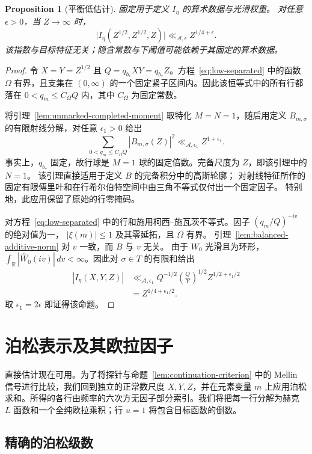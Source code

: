 \documentclass[11pt,a4paper]{article}
\numberwithin{equation}{section}
\numberwithin{figure}{section}
\newtheorem{proposition}[theorem]{Proposition}
\theoremstyle{definition}
\theoremstyle{remark}
\begin{document}
\begin{proposition}[平衡低估计]
\label{prop:balanced-low}
固定用于定义 $I_\eta$ 的算术数据与光滑权重。
对任意 $\epsilon>0$，当 $Z\to\infty$ 时，
\[
 \bigl|I_\eta(Z^{1/2},Z^{1/2},Z)\bigr|
 \ll_{\mathcal A,\epsilon} Z^{1/4+\epsilon}.
\]
该指数与目标特征无关；隐含常数与下阈值可能依赖于其固定的算术数据。
\end{proposition}

\begin{proof}
令 $X=Y=Z^{1/2}$ 且 $Q=q_{b_*}XY=q_{b_*}Z$。方程~\eqref{eq:low-separated} 中的函数 $\Omega$
有界，且支集在 $(0,\infty)$ 的一个固定紧子区间内。因此该恒等式中的所有行都落在
$0<q_m\le C_\Omega Q$ 内，其中 $C_\Omega$ 为固定常数。

将引理~\ref{lem:unmarked-completed-moment} 取特化 $M=N=1$，随后用定义 $B_{m,\sigma}$ 的有限射线分解，对任意 $\epsilon_1>0$ 给出
\[
 \sum_{0<q_m\le C_\Omega Q}|B_{m,\sigma}(Z)|^2
 \ll_{\mathcal A,\epsilon_1} Z^{1+\epsilon_1}.
\]
事实上，$q_{b_*}$ 固定，故行球是 $M=1$ 球的固定倍数。完备尺度为 $Z$，即该引理中的 $N=1$。
该引理直接适用于定义 $B$ 的完备积分中的高斯轮廓；
对射线特征所作的固定有限傅里叶和在行希尔伯特空间中由三角不等式仅付出一个固定因子。
特别地，此应用保留了原始的行零掩码。

对方程~\eqref{eq:low-separated} 中的行和施用柯西--施瓦茨不等式。因子 $(q_m/Q)^{-iv}$ 的绝对值为一，
$|\xi(m)|\le1$ 及其零延拓，且 $\Omega$ 有界。
引理~\ref{lem:balanced-additive-norm} 对 $v$ 一致，而 $B$ 与 $v$ 无关。
由于 $W_0$ 光滑且为环形，
$\int_{\mathbb R}|\widehat W_0(iv)|\,dv<\infty$。因此对 $\sigma\in T$ 的有限和给出
\[
 \begin{split}
 |I_\eta(X,Y,Z)|
 &\ll_{\mathcal A,\epsilon_1}
 Q^{-1/2}\left(\frac QY\right)^{1/2}Z^{1/2+\epsilon_1/2}\\
 &=Z^{1/4+\epsilon_1/2}.
 \end{split}
\]
取 $\epsilon_1=2\epsilon$ 即证得该命题。
\end{proof}

\section{泊松表示及其欧拉因子}
\label{sec:poisson-representation}直接估计现在可用。为了将探针与命题~\ref{lem:continuation-criterion} 中的 Mellin 信号进行比较，我们回到独立的正常数尺度 $X,Y,Z$，并在元素变量 $m$ 上应用泊松求和。所得的各行由频率的六次方无因子部分索引。我们将把每一行分解为赫克 $L$ 函数和一个全纯欧拉乘积；行 $u=1$ 将包含目标函数的倒数。

\subsection{精确的泊松级数}
\end{document}
